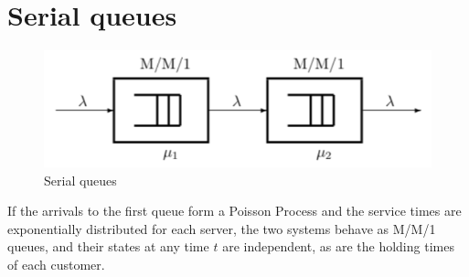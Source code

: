 \documentclass[12pt, openany]{report}
\theoremstyle{definition}
\begin{document}
\section{Serial queues}
\begin{figure}[H]
	\centering 
	\includegraphics[width=.8\textwidth]{img/serial_queues.png}
	\caption{Serial queues}
	\label{fig:serial_queues}
\end{figure}
If the arrivals to the first queue form a Poisson Process and the service times are exponentially distributed for each server, the two systems behave as M/M/1 queues, and their states at any time $t$ are independent, as are the holding times of each customer. 
\end{document}
